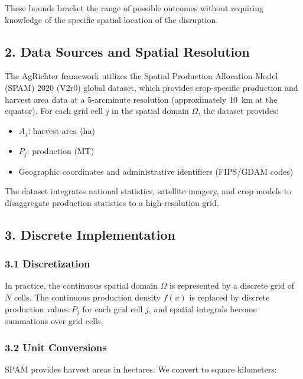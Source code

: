 \documentclass[11pt]{article}
\begin{document}
These bounds bracket the range of possible outcomes without requiring knowledge of the specific spatial location of the disruption.

\subsection*{2. Data Sources and Spatial Resolution}

The AgRichter framework utilizes the Spatial Production Allocation Model (SPAM) 2020 (V2r0) global dataset\cite{yu2020spatial}, which provides crop-specific production and harvest area data at a 5-arcminute resolution (approximately 10~km at the equator). For each grid cell $j$ in the spatial domain $\Omega$, the dataset provides:

\begin{itemize}
    \item $A_{j}$: harvest area (ha)
    \item $P_j$: production (MT)
    \item Geographic coordinates and administrative identifiers (FIPS/GDAM codes)
\end{itemize}

The dataset integrates national statistics, satellite imagery, and crop models to disaggregate production statistics to a high-resolution grid\cite{you2014spatial}.

\subsection*{3. Discrete Implementation}

\subsubsection*{3.1 Discretization}
In practice, the continuous spatial domain $\Omega$ is represented by a discrete grid of $N$ cells. The continuous production density $f(x)$ is replaced by discrete production values $P_j$ for each grid cell $j$, and spatial integrals become summations over grid cells.

\subsubsection*{3.2 Unit Conversions}
SPAM provides harvest areas in hectares. We convert to square kilometers:
\end{document}
